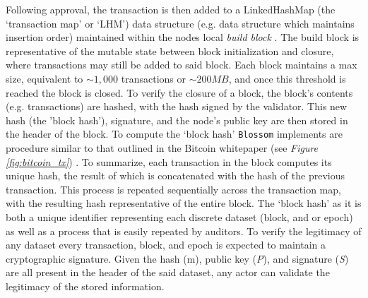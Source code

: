 Following approval, the transaction is then added to a LinkedHashMap (the ‘transaction map’ or ‘LHM') data structure (e.g. data structure which maintains insertion order) maintained within the nodes local \textit{build block} \cite{oracle-si}. The build block is representative of the mutable state between block initialization and closure, where transactions may still be added to said block. Each block maintains a max size, equivalent to \(\sim 1,000\) transactions or \(\sim 200 MB\), and once this threshold is reached the block is closed. To verify the closure of a block, the block’s contents (e.g. transactions) are hashed, with the hash signed by the validator. This new hash (the 'block hash’), signature, and the node’s public key are then stored in the header of the block. To compute the ‘block hash’ \texttt{Blossom} implements are procedure similar to that outlined in the Bitcoin whitepaper (see \textit{Figure \ref{fig:bitcoin_tx}}) \cite{Nakamoto2008}. To summarize, each transaction in the block computes its unique hash, the result of which is concatenated with the hash of the previous transaction. This process is repeated sequentially across the transaction map, with the resulting hash representative of the entire block. The ‘block hash’ as it is both a unique identifier representing each discrete dataset (block, and or epoch) as well as a process that is easily repeated by auditors. To verify the legitimacy of any dataset every transaction, block, and epoch is expected to maintain a cryptographic signature. Given the hash (m), public key (\textit{P}), and signature (\textit{S}) are all present in the header of the said dataset, any actor can validate the legitimacy of the stored information.



